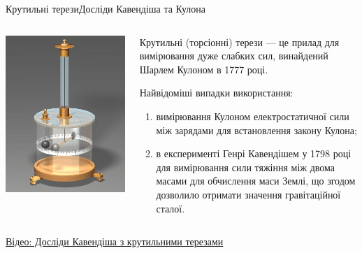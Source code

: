 \documentclass{beamer}
\begin{document}
\begin{frame}{Крутильні терези}{Досліди Кавендіша та Кулона}
	\begin{columns}
		\begin{column}{0.4\linewidth}
			\begin{center}
				\includegraphics[width=\linewidth]{ColumbTorsiomBalance}
			\end{center}
		\end{column}
		\begin{column}{0.6\linewidth}\small\justifying
			\alert{Крутильні (торсіонні) терези} --- це прилад для вимірювання
			дуже слабких сил,
			винайдений Шарлем Кулоном в 1777 році.

			\medskip

			Найвідоміші випадки  використання:
			\begin{enumerate}\justifying
				\item вимірювання Кулоном електростатичної сили між зарядами
				      для встановлення закону Кулона;
				\item в експерименті Генрі Кавендішем у 1798 році для
				      вимірювання сили тяжіння між двома масами для обчислення маси
				      Землі, що згодом дозволило отримати значення гравітаційної
				      сталої.
			\end{enumerate}
		\end{column}
	\end{columns}
	\vfill

	\href{https://www.youtube.com/watch?v=5pmkBq3eDcw}{\scriptsize Відео:
		Досліди Кавендіша з крутильними терезами}
\end{frame}
\end{document}
